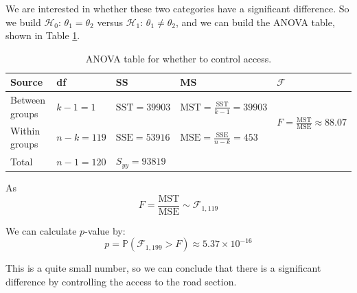 We are interested in whether these two categories have a significant difference. So we build $\mathcal{H}_0$: $\theta_1 = \theta_2$ versus $\mathcal{H}_1$: $\theta_1\neq\theta_2$, and we can build the ANOVA table, shown in Table \ref{tab:x4_anova}.

\begin{table}[ht]
    \centering
    \begin{tabular}{l|l|l|l|l}
    \toprule
        \textbf{Source} & \textbf{df} & \textbf{SS} & \textbf{MS} & $\mathcal{F}$ \\
        \midrule
        Between groups & $k - 1 = 1$ & $\mathrm{SST} = 39903$ & $\mathrm{MST} = \frac{\mathrm{SST}}{k - 1} = 39903$ & \multirow{2}{*}{$F = \frac{\mathrm{MST}}{\mathrm{MSE}} \approx 88.07$} \\
        Within groups & $n - k = 119$ & $\mathrm{SSE} = 53916$ & $\mathrm{MSE} = \frac{\mathrm{SSE}}{n - k} = 453$ & \\
        \midrule
        Total & $n - 1 = 120$ & $S_{yy} = 93819$ & & \\
    \bottomrule
    \end{tabular}
    \caption{ANOVA table for whether to control access.}
    \label{tab:x4_anova}
\end{table}

As
\begin{equation}
F = \frac{\mathrm{MST}}{\mathrm{MSE}} \sim \mathcal{F}_{1, 119}
\end{equation}

We can calculate $p$-value by:
\begin{equation}
p = \mathbb{P}\left(\mathcal{F}_{1, 199}>F\right)\approx 5.37\times 10^{-16}
\end{equation}

This is a quite small number, so we can conclude that there is a significant difference by controlling the access to the road section.

